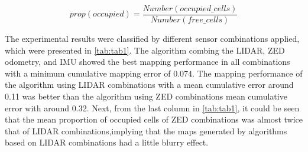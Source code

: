 \documentclass[english]{article}
\begin{document}
\begin{equation}
prop\left(occupied\right)=\frac{Number\left(occupied\_cells\right)}
{Number\left(free\_cells\right)}
    \label{eq:equation_3}
\end{equation}

The  experimental  results  were  classified  by  different  sensor  
combinations  applied,  which  were  presented  in \cref{tab:tab1}.  The 
algorithm combing the LIDAR, ZED odometry, and IMU showed the best mapping 
performance in all combinations with a minimum cumulative mapping error of 
0.074.  The mapping performance of the algorithm using LIDAR combinations 
with a mean cumulative error around 0.11 was better than the algorithm 
using ZED combinations  mean  cumulative  error  with  around  0.32.   
Next,  from  the  last  column  in  \cref{tab:tab1},  it  could  be  seen 
that the mean proportion of occupied cells of ZED combinations was almost 
twice that of LIDAR combinations,implying that the maps generated by 
algorithms based on LIDAR combinations had a little blurry effect.



\end{document}
